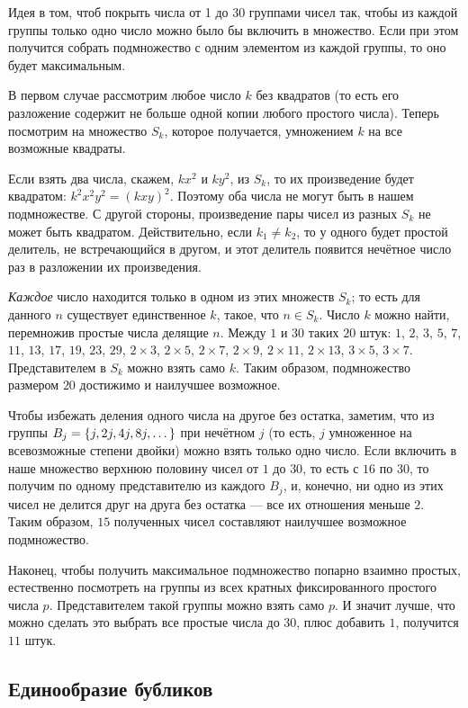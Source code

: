 Идея в том, чтоб покрыть числа от 1 до 30 группами чисел так, чтобы из каждой группы только одно число можно было бы включить в множество.
Если при этом получится собрать подмножество с одним элементом из каждой группы, то оно будет максимальным.

В первом случае рассмотрим любое число $k$ без квадратов (то есть его разложение содержит не больше одной копии любого простого числа).
Теперь посмотрим на множество $S_k$, которое получается, умножением $k$ на все возможные квадраты.

Если взять два числа, скажем, $kx^2$ и $ky^2$, из $S_k$, то их произведение будет квадратом: $k^2x^2y^2 = (kxy)^2$.
Поэтому оба числа не могут быть в нашем подмножестве.
С другой стороны, произведение пары чисел из разных $S_k$ не может быть квадратом.
Действительно, если $k_1\ne k_2$, то у одного будет простой делитель, не встречающийся в другом, и этот делитель появится нечётное число раз в разложении их произведения.

\emph{Каждое} число находится только в одном из этих множеств $S_k$;
то есть для данного $n$ существует единственное $k$, такое, что $n \in S_k$.
Число $k$ можно найти, перемножив простые числа делящие $n$.
Между $1$ и $30$ таких $20$ штук: $1$, $2$, $3$, $5$, $7$, $11$, $13$, $17$, $19$,
$23$, $29$, $2 \times 3$, $2 \times 5$, $2 \times 7$, $2 \times 9$, $2 \times 11$, $2 \times 13$, $3 \times 5$, $3 \times 7$.
Представителем в $S_k$ можно взять само $k$.
Таким образом, подмножество размером $20$ достижимо и наилучшее возможное.

Чтобы избежать деления одного числа на другое без остатка, заметим, что из группы $B_j \z= \{j, 2j, 4j, 8j, \dots\}$ при нечётном $j$ (то есть, $j$ умноженное на всевозможные степени двойки) можно взять только одно число.
Если включить в наше множество верхнюю половину чисел от $1$ до $30$, то есть с $16$ по $30$, то получим по одному представителю из каждого $B_j$, и, конечно, ни одно из этих чисел не делится друг на друга без остатка --- все их отношения меньше $2$.
Таким образом, $15$ полученных чисел составляют наилучшее возможное подмножество.

Наконец, чтобы получить максимальное подмножество попарно взаимно простых, естественно посмотреть на группы из всех кратных фиксированного простого числа $p$.
Представителем такой группы можно взять само $p$. 
И значит лучше, что можно сделать это выбрать все простые числа до $30$, плюс добавить $1$, получится $11$ штук.

\subsection*{Единообразие бубликов}

